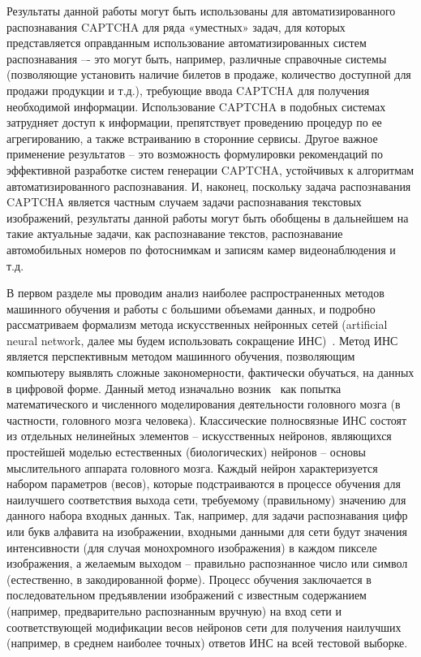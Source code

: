\documentclass[a4paper,12pt,russian]{article} %
\begin{document}
Результаты данной работы могут быть использованы для автоматизированного распознавания CAPTCHA для ряда «уместных» задач, для которых представляется оправданным использование автоматизированных систем распознавания –- это могут быть, например, различные справочные системы (позволяющие установить наличие билетов в продаже, количество доступной для продажи продукции и т.д.), требующие ввода CAPTCHA для получения необходимой информации. Использование CAPTCHA в подобных системах затрудняет доступ к информации, препятствует проведению процедур по ее агрегированию, а также встраиванию в сторонние сервисы.
Другое важное применение результатов – это возможность формулировки рекомендаций по эффективной разработке систем генерации CAPTCHA, устойчивых к алгоритмам автоматизированного распознавания.
И, наконец, поскольку задача распознавания CAPTCHA является частным случаем задачи распознавания текстовых изображений, результаты данной работы могут быть обобщены в дальнейшем на такие актуальные задачи, как распознавание текстов, распознавание автомобильных номеров по фотоснимкам и записям камер видеонаблюдения и т.д.

В первом разделе мы проводим анализ наиболее распространенных методов машинного обучения и работы с большими объемами данных, и подробно рассматриваем формализм метода искусственных нейронных сетей (artificial neural network, далее мы будем использовать сокращение ИНС)~\cite{hebb2005organization,haykin2008nnbook}.
Метод ИНС является перспективным методом машинного обучения, позволяющим компьютеру выявлять сложные закономерности, фактически обучаться, на данных в цифровой форме.
Данный метод изначально возник~\cite{mcculloch1943logical} как попытка математического и численного моделирования деятельности головного мозга (в частности, головного мозга человека).
Классические полносвязные ИНС  состоят из отдельных нелинейных элементов -- искусственных нейронов, являющихся простейшей моделью естественных (биологических) нейронов -- основы мыслительного аппарата головного мозга.
Каждый нейрон характеризуется набором параметров (весов), которые подстраиваются в процессе обучения для наилучшего соответствия выхода сети, требуемому (правильному) значению для данного набора входных данных.
Так, например, для задачи распознавания цифр или букв алфавита на изображении, входными данными для сети будут значения интенсивности (для случая монохромного изображения) в каждом пикселе изображения, а желаемым выходом -- правильно распознанное число или символ (естественно, в закодированной форме).
Процесс обучения заключается в последовательном предъявлении изображений с известным  содержанием (например, предварительно распознанным вручную) на вход сети и соответствующей модификации весов нейронов сети для получения наилучших (например, в среднем наиболее точных) ответов ИНС на всей тестовой выборке.
\end{document}
